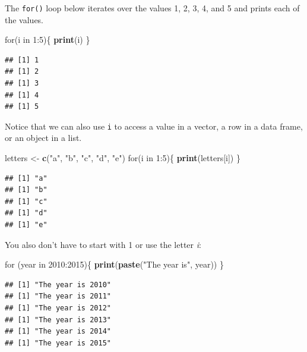 \documentclass[]{book}
\newenvironment{Shaded}{\begin{snugshade}}{\end{snugshade}}
\newcommand{\KeywordTok}[1]{\textcolor[rgb]{0.13,0.29,0.53}{\textbf{{#1}}}}
\newcommand{\DecValTok}[1]{\textcolor[rgb]{0.00,0.00,0.81}{{#1}}}
\newcommand{\StringTok}[1]{\textcolor[rgb]{0.31,0.60,0.02}{{#1}}}
\newcommand{\NormalTok}[1]{{#1}}
\begin{document}
The \texttt{for()} loop below iterates over the values 1, 2, 3, 4, and 5
and prints each of the values.

\begin{Shaded}
\begin{Highlighting}[]
\NormalTok{for(i in }\DecValTok{1}\NormalTok{:}\DecValTok{5}\NormalTok{)\{}
  \KeywordTok{print}\NormalTok{(i)}
\NormalTok{\}}
\end{Highlighting}
\end{Shaded}

\begin{verbatim}
## [1] 1
## [1] 2
## [1] 3
## [1] 4
## [1] 5
\end{verbatim}

Notice that we can also use \texttt{i} to access a value in a vector, a
row in a data frame, or an object in a list.

\begin{Shaded}
\begin{Highlighting}[]
\NormalTok{letters <-}\StringTok{ }\KeywordTok{c}\NormalTok{(}\StringTok{"a"}\NormalTok{, }\StringTok{"b"}\NormalTok{, }\StringTok{"c"}\NormalTok{, }\StringTok{"d"}\NormalTok{, }\StringTok{"e"}\NormalTok{)}
\NormalTok{for(i in }\DecValTok{1}\NormalTok{:}\DecValTok{5}\NormalTok{)\{}
  \KeywordTok{print}\NormalTok{(letters[i])}
\NormalTok{\}}
\end{Highlighting}
\end{Shaded}

\begin{verbatim}
## [1] "a"
## [1] "b"
## [1] "c"
## [1] "d"
## [1] "e"
\end{verbatim}

You also don't have to start with 1 or use the letter \emph{i}:

\begin{Shaded}
\begin{Highlighting}[]
\NormalTok{for (year in }\DecValTok{2010}\NormalTok{:}\DecValTok{2015}\NormalTok{)\{}
  \KeywordTok{print}\NormalTok{(}\KeywordTok{paste}\NormalTok{(}\StringTok{"The year is"}\NormalTok{, year))}
\NormalTok{\}}
\end{Highlighting}
\end{Shaded}

\begin{verbatim}
## [1] "The year is 2010"
## [1] "The year is 2011"
## [1] "The year is 2012"
## [1] "The year is 2013"
## [1] "The year is 2014"
## [1] "The year is 2015"
\end{verbatim}
\end{document}
